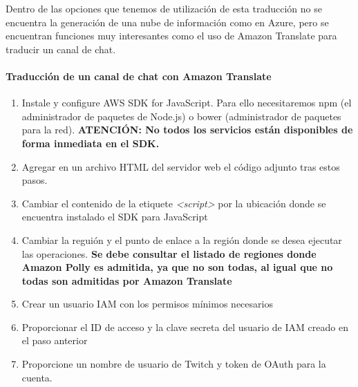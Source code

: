 \documentclass[english,runningheads,a4paper]{llncs}[2018/03/10]
\begin{document}
    Dentro de las opciones que tenemos de utilización de esta traducción no se 
    encuentra la generación de una nube de información como en Azure, pero se 
    encuentran funciones muy interesantes como el uso de Amazon Translate para 
    traducir un canal de chat.
    
    \paragraph{Traducción de un canal de chat con Amazon Translate}
    \begin{enumerate}
        \item Instale y configure AWS SDK for JavaScript. Para ello 
        necesitaremos npm (el administrador de paquetes de Node.js) o bower 
        (administrador de paquetes para la red). \textbf{ATENCIÓN: No todos los 
        servicios están disponibles de forma inmediata en el SDK.}
        \item Agregar en un archivo HTML del servidor web el código adjunto tras
        estos pasos.
        
        \item Cambiar el contenido de la etiquete \textit{<script>}
        por la ubicación donde se encuentra instalado el SDK para JavaScript
        \item Cambiar la reguión y el punto de enlace a la región donde se desea
        ejecutar las operaciones. \textbf{Se debe consultar el listado de 
        regiones donde Amazon Polly es admitida, ya que no son todas, al igual 
        que no todas son admitidas por Amazon Translate}
        \item Crear un usuario IAM con los permisos mínimos necesarios
        \item Proporcionar el ID de acceso y la clave secreta del usuario de IAM
        creado en el paso anterior
        \item Proporcione un nombre de usuario de Twitch y token de OAuth para 
        la cuenta.
    \end{enumerate}
\end{document}
